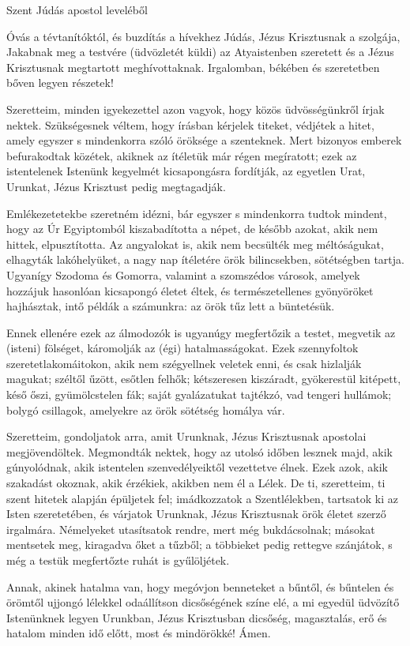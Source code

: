 \documentclass[twoside]{article}
\begin{document}
Szent Júdás apostol leveléből

\begin{lectio}{Óvás a tévtanítóktól, és buzdítás a hívekhez}
\noindent Júdás, Jézus Krisztusnak a szolgája, Jakabnak meg a testvére (üdvözletét küldi) az Atyaistenben szeretett és a Jézus Krisztusnak megtartott meghívottaknak. Irgalomban, békében és szeretetben bőven legyen részetek!

Szeretteim, minden igyekezettel azon vagyok, hogy közös üdvösségünkről írjak nektek. Szükségesnek véltem, hogy írásban kérjelek titeket, védjétek a hitet, amely egyszer s mindenkorra szóló öröksége a szenteknek. Mert bizonyos emberek befurakodtak közétek, akiknek az ítéletük már régen megíratott; ezek az istentelenek Istenünk kegyelmét kicsapongásra fordítják, az egyetlen Urat, Urunkat, Jézus Krisztust pedig megtagadják.

Emlékezetetekbe szeretném idézni, bár egyszer s mindenkorra tudtok mindent, hogy az Úr Egyiptomból kiszabadította a népet, de később azokat, akik nem hittek, elpusztította. Az angyalokat is, akik nem becsülték meg méltóságukat, elhagyták lakóhelyüket, a nagy nap ítéletére örök bilincsekben, sötétségben tartja. Ugyanígy Szodoma és Gomorra, valamint a szomszédos városok, amelyek hozzájuk hasonlóan kicsapongó életet éltek, és természetellenes gyönyöröket hajhásztak, intő példák a számunkra: az örök tűz lett a büntetésük.

Ennek ellenére ezek az álmodozók is ugyanúgy megfertőzik a testet, megvetik az (isteni) fölséget, káromolják az (égi) hatalmasságokat. Ezek szennyfoltok szeretetlakomáitokon, akik nem szégyellnek veletek enni, és csak hizlalják magukat; széltől űzött, esőtlen felhők; kétszeresen kiszáradt, gyökerestül kitépett, késő őszi, gyümölcstelen fák; saját gyalázatukat tajtékzó, vad tengeri hullámok; bolygó csillagok, amelyekre az örök sötétség homálya vár.

Szeretteim, gondoljatok arra, amit Urunknak, Jézus Krisztusnak apostolai megjövendöltek. Megmondták nektek, hogy az utolsó időben lesznek majd, akik gúnyolódnak, akik istentelen szenvedélyeiktől vezettetve élnek. Ezek azok, akik szakadást okoznak, akik érzékiek, akikben nem él a Lélek. De ti, szeretteim, ti szent hitetek alapján épüljetek fel; imádkozzatok a Szentlélekben, tartsatok ki az Isten szeretetében, és várjatok Urunknak, Jézus Krisztusnak örök életet szerző irgalmára. Némelyeket utasítsatok rendre, mert még bukdácsolnak; másokat mentsetek meg, kiragadva őket a tűzből; a többieket pedig rettegve szánjátok, s még a testük megfertőzte ruhát is gyűlöljétek.

Annak, akinek hatalma van, hogy megóvjon benneteket a bűntől, és bűntelen és örömtől ujjongó lélekkel odaállítson dicsőségének színe elé, a mi egyedül üdvözítő Istenünknek legyen Urunkban, Jézus Krisztusban dicsőség, magasztalás, erő és hatalom minden idő előtt, most és mindörökké! Ámen.
\end{lectio}
\end{document}
